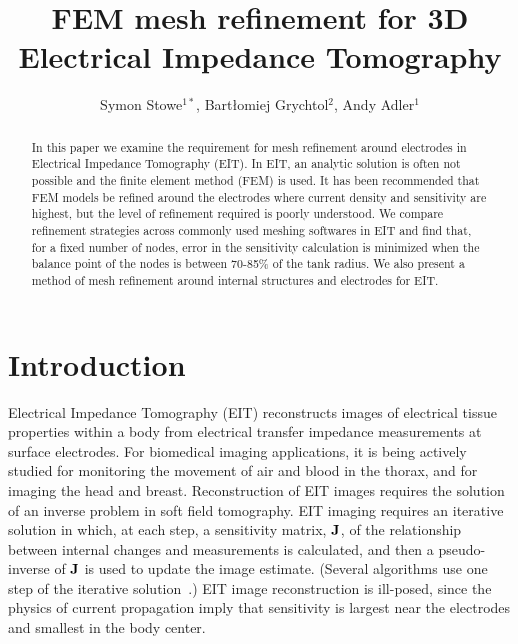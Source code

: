 \documentclass[12pt]{iopart}
\newcommand{\COMMENT}[1]{ \textsf{\color{blue}{{COMMENT: #1}}} }
\begin{document}
\title{%
FEM mesh refinement for 3D Electrical Impedance Tomography %
}

 \author{%
Symon Stowe$^{1*}$,
Bart\l{}omiej Grychtol$^2$,
Andy Adler$^1$}

\address{
$^1$~Systems and Computer Engineering, Carleton University, Ottawa, Canada
$^2$~\COMMENT{TODO: Fill this in}
}
\vspace{10pt}

\begin{abstract}
In this paper we examine the requirement for mesh refinement around 
electrodes in Electrical Impedance Tomography (EIT). In EIT, an analytic solution is
often not possible and the finite
element method (FEM) is used. 
It has been recommended that FEM models be refined around the electrodes where current
density and sensitivity are highest, but the level of refinement required is poorly understood.
We compare refinement strategies across commonly used meshing softwares in EIT and
find that, for a fixed number of nodes, error in the sensitivity calculation is minimized 
when the balance point of the nodes is between 70-85\% of the tank radius. We also present 
a method of mesh refinement around internal structures and electrodes for EIT.
\end{abstract}

\section{Introduction}
Electrical Impedance Tomography (EIT) reconstructs images of 
electrical tissue properties within a body from electrical
transfer impedance measurements at surface electrodes. For
biomedical imaging applications, it is being actively studied
for monitoring
the movement of air and blood in the thorax, and for imaging
the head and breast. Reconstruction of EIT images requires
the solution of an inverse problem in soft field tomography.
EIT imaging requires an iterative solution in which, at each step,
a sensitivity matrix, $\bf J$, of
the relationship between internal changes and measurements
is calculated, and then a pseudo-inverse of $\bf J$ is used
to update the image estimate. (Several algorithms use
one step of the iterative solution~\parencite{lionheart_eit_2004}.)
EIT image reconstruction is ill-posed, since the physics of
current propagation imply that sensitivity is largest near
the electrodes and smallest in the body center.
\end{document}
